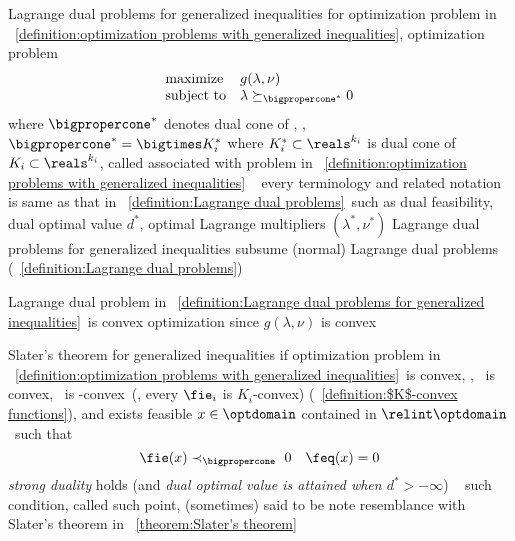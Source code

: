 \documentclass[17pt,landscape]{foils}
\begin{document}
{

\begin{mydefinition}{Lagrange dual problems for generalized inequalities}
	for optimization problem in ~\ref{definition:optimization problems with generalized inequalities},
	optimization problem
	$$
		\begin{array}{ll}
			\mbox{maximize} &
				g(\lambda,\nu)
			\\
			\mbox{subject to} &
				\lambda \succeq_{\bigpropercone^\ast} 0
		\end{array}
	$$
	where $\bigpropercone^\ast$ denotes dual cone of \bigpropercone,
	\ie,
	$\bigpropercone^\ast = \bigtimes K_i^\ast$
	where $K_i^\ast\subset\reals^{k_i}$ is dual cone of $K_i\subset\reals^{k_i}$,
	called 
	associated with problem in ~\ref{definition:optimization problems with generalized inequalities}
	\shrinkspacewithintheoremslike\
	\ibit
	\iitem
		every terminology and related notation
		is same as that in ~\ref{definition:Lagrange dual problems}\
		such as
		dual feasibility,
		dual optimal value $d^\ast$,
		optimal Lagrange multipliers $(\lambda^\ast,\nu^\ast)$
	\iitem
		Lagrange dual problems for generalized inequalities
		{subsume}
		(normal) Lagrange dual problems (~\ref{definition:Lagrange dual problems})
	\eit
\end{mydefinition}
%

\bit
\vitem
	Lagrange dual problem in ~\ref{definition:Lagrange dual problems for generalized inequalities}\
	is convex optimization
	since $g(\lambda,\nu)$ is convex
\eit
\vfill



\begin{mytheorem}{Slater's theorem for generalized inequalities}
	if optimization problem
	in ~\ref{definition:optimization problems with generalized inequalities}\
	is convex,
	\ie,
	\fobj\ is convex,
	\fie\ is \bigpropercone-convex\
	(\ie, every $\fie_i$ is $K_i$-convex)
	(~\ref{definition:$K$-convex functions}),
	and exists feasible $x\in\optdomain$ contained in $\relint \optdomain$\
	such that
	$$
		\fie(x) \prec_\bigpropercone\ 0\quad \feq(x) = 0
	$$
	\emph{strong duality} holds
	(and \emph{dual optimal value is attained when $d^\ast>-\infty$})
	\shrinkspacewithintheoremslike\
	\ibit
	\iitem
		such condition, called 
	\iitem
		such point, (sometimes) said to be 
	\iitem
		note resemblance with Slater's theorem in \theoremname~\ref{theorem:Slater's theorem}\
	\eit
\end{mytheorem}


}
\end{document}
